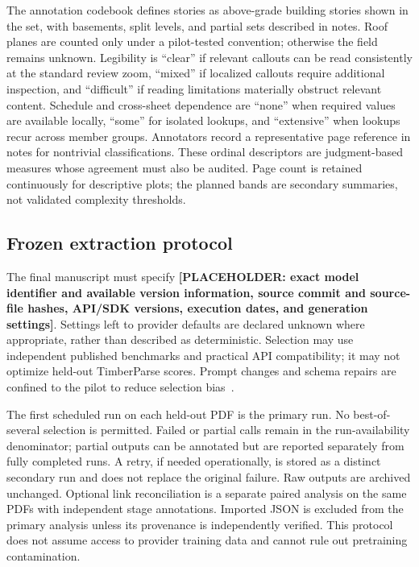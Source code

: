 \documentclass[11pt]{article}
\newcommand{\todo}[1]{\textcolor{blue!65!black}{\textbf{[PLACEHOLDER: #1]}}}
\begin{document}
The annotation codebook defines stories as above-grade building stories shown in the set, with basements, split levels, and partial sets described in notes. Roof planes are counted only under a pilot-tested convention; otherwise the field remains unknown. Legibility is ``clear'' if relevant callouts can be read consistently at the standard review zoom, ``mixed'' if localized callouts require additional inspection, and ``difficult'' if reading limitations materially obstruct relevant content. Schedule and cross-sheet dependence are ``none'' when required values are available locally, ``some'' for isolated lookups, and ``extensive'' when lookups recur across member groups. Annotators record a representative page reference in notes for nontrivial classifications. These ordinal descriptors are judgment-based measures whose agreement must also be audited. Page count is retained continuously for descriptive plots; the planned bands are secondary summaries, not validated complexity thresholds.

\subsection{Frozen extraction protocol}
The final manuscript must specify \todo{exact model identifier and available version information, source commit and source-file hashes, API/SDK versions, execution dates, and generation settings}. Settings left to provider defaults are declared unknown where appropriate, rather than described as deterministic. Selection may use independent published benchmarks and practical API compatibility; it may not optimize held-out TimberParse scores. Prompt changes and schema repairs are confined to the pilot to reduce selection bias~\cite{cawley2010}.

The first scheduled run on each held-out PDF is the primary run. No best-of-several selection is permitted. Failed or partial calls remain in the run-availability denominator; partial outputs can be annotated but are reported separately from fully completed runs. A retry, if needed operationally, is stored as a distinct secondary run and does not replace the original failure. Raw outputs are archived unchanged. Optional link reconciliation is a separate paired analysis on the same PDFs with independent stage annotations. Imported JSON is excluded from the primary analysis unless its provenance is independently verified. This protocol does not assume access to provider training data and cannot rule out pretraining contamination.
\end{document}
